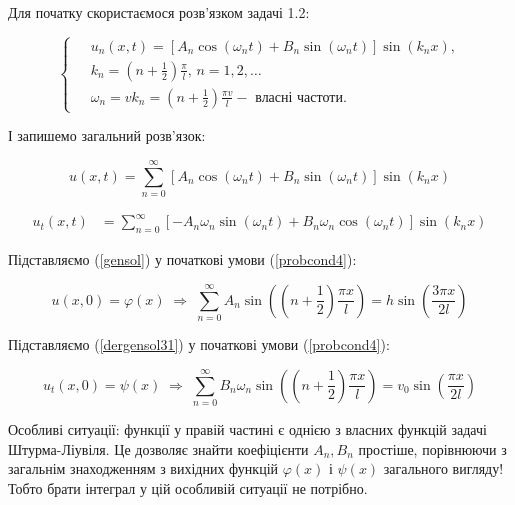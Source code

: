 Для початку скористаємося розв'язком задачі 1.2:

\begin{equation}
    \left\{ \begin{aligned} \label{fullsol}
        \;&u_n(x,t) = \left[A_n\cos(\omega_n t) + B_n\sin(\omega_n t)\right] \sin(k_n x), \\
        &k_n = (n + \frac{1}{2})\frac{\pi}{l}, \, n = 1, 2,\ldots\\
        &\omega_n = vk_n = (n + \frac{1}{2})\frac{\pi v}{l} - \text{ власні частоти}.
    \end{aligned}\right.
\end{equation}

І запишемо загальний розв'язок:

\begin{equation} \label{gensol}
    u(x,t) = \sum^{\infty}_{n=0} \left[A_n\cos(\omega_n t) + B_n\sin(\omega_n t)\right] \sin(k_n x)
\end{equation}

\begin{equation} \label{dersol}
    \begin{aligned}
        u_t(x,t) &= 
   \sum^{\infty}_{n=0}\left[-A_n\omega_n\sin(\omega_n t) + B_n\omega_n\cos(\omega_n t)\right] \sin(k_n x)  
    \end{aligned}
\end{equation}

Підставляємо (\ref{gensol}) у початкові умови (\ref{probcond4}):

\begin{equation} \label{sol-init-pos}
    u(x,0) = \varphi(x) \;\Rightarrow\; \sum^{\infty}_{n=0} A_n\sin\left((n + \frac{1}{2}) \frac{\pi x}{l} \right) = h \sin \left( \frac{3 \pi x}{2l} \right)
\end{equation}


Підставляємо (\ref{dergensol31}) у початкові умови (\ref{probcond4}):

\begin{equation} \label{sol-init-pos}
    u_t(x,0) = \psi(x) \;\Rightarrow\; \sum^{\infty}_{n=0} B_n \omega_n \sin\left((n + \frac{1}{2}) \frac{\pi x}{l} \right) = v_0 \sin \left( \frac{ \pi x}{2l} \right)
\end{equation}

Особливі ситуації: функції у правій частині є однією з власних функцій задачі Штурма-Ліувіля. Це дозволяє знайти коефіцієнти $A_n, B_n$ простіше, порівнюючи з загальнім знаходженням з вихідних функцій $\varphi(x)$ і  $\psi(x)$ загального вигляду! Тобто брати інтеграл у цій особливій ситуації не потрібно.


